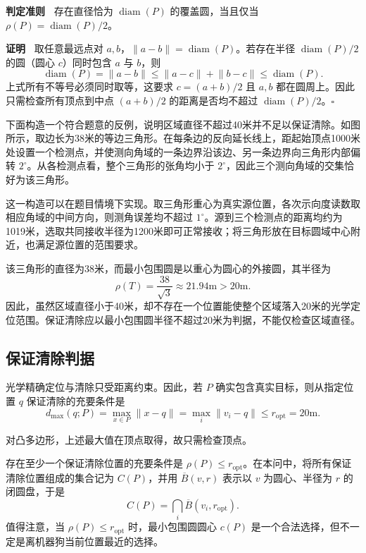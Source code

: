 \documentclass[UTF8,a4paper,zihao=-4,fontset=none]{ctexart}
\begin{document}
\textbf{判定准则\ } 存在直径恰为 \(\operatorname{diam}(P)\) 的覆盖圆，当且仅当 \(\rho(P)=\operatorname{diam}(P)/2\)。

\textbf{证明\ } 取任意最远点对 \(a,b\)，\(\lVert a-b\rVert=\operatorname{diam}(P)\)。若存在半径 \(\operatorname{diam}(P)/2\) 的圆（圆心 \(c\)）同时包含 \(a\) 与 \(b\)，则
\begin{equation}
  \operatorname{diam}(P)=\lVert a-b\rVert\le\lVert a-c\rVert+\lVert b-c\rVert\le\operatorname{diam}(P) .
\end{equation}
上式所有不等号必须同时取等，这要求 \(c=(a+b)/2\) 且 \(a,b\) 都在圆周上。因此只需检查所有顶点到中点 \((a+b)/2\) 的距离是否均不超过 \(\operatorname{diam}(P)/2\)。\(\square\)

下面构造一个符合题意的反例，说明区域直径不超过40米并不足以保证清除。如图所示，取边长为38米的等边三角形。在每条边的反向延长线上，距起始顶点1000米处设置一个检测点，并使测向角域的一条边界沿该边、另一条边界向三角形内部偏转 \(2^\circ\)。从各检测点看，整个三角形的张角均小于 \(2^\circ\)，因此三个测向角域的交集恰好为该三角形。

这一构造可以在题目情境下实现。取三角形重心为真实源位置，各次示向度读数取相应角域的中间方向，则测角误差均不超过 \(1^\circ\)。源到三个检测点的距离均约为1019米，选取共同接收半径为1200米即可正常接收；将三角形放在目标圆域中心附近，也满足源位置的范围要求。

该三角形的直径为38米，而最小包围圆是以重心为圆心的外接圆，其半径为
\begin{equation}
  \rho(T)=\frac{38}{\sqrt{3}}\approx21.94\mathrm{m}>20\mathrm{m}.
  \label{eq:counterexample}
\end{equation}
因此，虽然区域直径小于40米，却不存在一个位置能使整个区域落入20米的光学定位范围。保证清除应以最小包围圆半径不超过20米为判据，不能仅检查区域直径。

\subsection{保证清除判据}

光学精确定位与清除只受距离约束。因此，若 \(P\) 确实包含真实目标，则从指定位置 \(q\) 保证清除的充要条件是
\begin{equation}
  d_{\max}(q;P)=\max_{x\in P}\lVert x-q\rVert=\max_i\lVert v_i-q\rVert\le r_{\mathrm{opt}} =20\mathrm{m}.
  \label{eq:clear-condition}
\end{equation}

对凸多边形，上述最大值在顶点取得，故只需检查顶点。

存在至少一个保证清除位置的充要条件是 \(\rho(P)\le r_{\mathrm{opt}}\)。在本问中，将所有保证清除位置组成的集合记为 \(C(P)\)，并用 \(\overline B(v,r)\) 表示以 \(v\) 为圆心、半径为 \(r\) 的闭圆盘，于是
\begin{equation}
  C(P)=\bigcap_i\overline{B}(v_i,r_{\mathrm{opt}}).
  \label{eq:clear-set}
\end{equation}
值得注意，当 \(\rho(P)\le r_{\mathrm{opt}}\) 时，最小包围圆圆心 \(c(P)\) 是一个合法选择，但不一定是离机器狗当前位置最近的选择。
\end{document}
